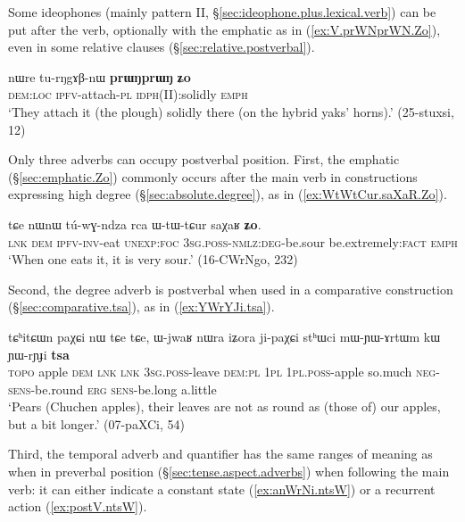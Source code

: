 Some ideophones (mainly pattern II, §\ref{sec:ideophone.plus.lexical.verb}) can be put after the verb, optionally with  the emphatic  as in (\ref{ex:V.prWNprWN.Zo}), even in some relative clauses (§\ref{sec:relative.postverbal}).

\begin{exe}
\ex \label{ex:V.prWNprWN.Zo}
\gll nɯre tu-rŋgɤβ-nɯ \textbf{prɯŋprɯŋ} \textbf{ʑo} \\
\textsc{dem}:\textsc{loc} \textsc{ipfv}-attach-\textsc{pl} \textsc{idph}(II):solidly \textsc{emph} \\
\glt `They attach it (the plough) solidly there (on the hybrid yaks' horns).' (25-stuxsi, 12)
\end{exe}

Only three adverbs can occupy postverbal position. First, the emphatic  (§\ref{sec:emphatic.Zo}) commonly occurs after the main verb in constructions expressing high degree (§\ref{sec:absolute.degree}), as in (\ref{ex:WtWtCur.saXaR.Zo}).

\begin{exe}
\ex \label{ex:WtWtCur.saXaR.Zo}
\gll  tɕe nɯnɯ tú-wɣ-ndza rca ɯ-tɯ-tɕur saχaʁ \textbf{ʑo}. \\
\textsc{lnk} \textsc{dem} \textsc{ipfv}-\textsc{inv}-eat \textsc{unexp}:\textsc{foc} \textsc{3sg}.\textsc{poss}-\textsc{nmlz}:\textsc{deg}-be.sour be.extremely:\textsc{fact} \textsc{emph} \\
\glt `When one eats it, it is very sour.' (16-CWrNgo, 232)
\end{exe}

Second, the degree adverb  is postverbal when used in a comparative construction (§\ref{sec:comparative.tsa}), as in (\ref{ex:YWrYJi.tsa}).

\begin{exe}
\ex \label{ex:YWrYJi.tsa}
\gll tɕʰitɕɯn paχɕi nɯ tɕe tɕe, ɯ-jwaʁ nɯra iʑora ji-paχɕi stʰɯci mɯ-ɲɯ-ɤrtɯm kɯ ɲɯ-rɲɟi \textbf{tsa} \\
\textsc{topo} apple \textsc{dem} \textsc{lnk} \textsc{lnk} \textsc{3sg}.\textsc{poss}-leave \textsc{dem}:\textsc{pl} \textsc{1pl} \textsc{1pl}.\textsc{poss}-apple so.much \textsc{neg}-\textsc{sens}-be.round \textsc{erg} \textsc{sens}-be.long a.little \\
\glt `Pears (Chuchen apples), their leaves are not as round as (those of) our apples, but a bit longer.' (07-paXCi, 54)
\end{exe}

Third, the temporal adverb and quantifier  has the same ranges of meaning as when in preverbal position (§\ref{sec:tense.aspect.adverbs})  when following the main verb: it can either indicate a constant state (\ref{ex:anWrNi.ntsW}) or a recurrent action (\ref{ex:postV.ntsW}).

